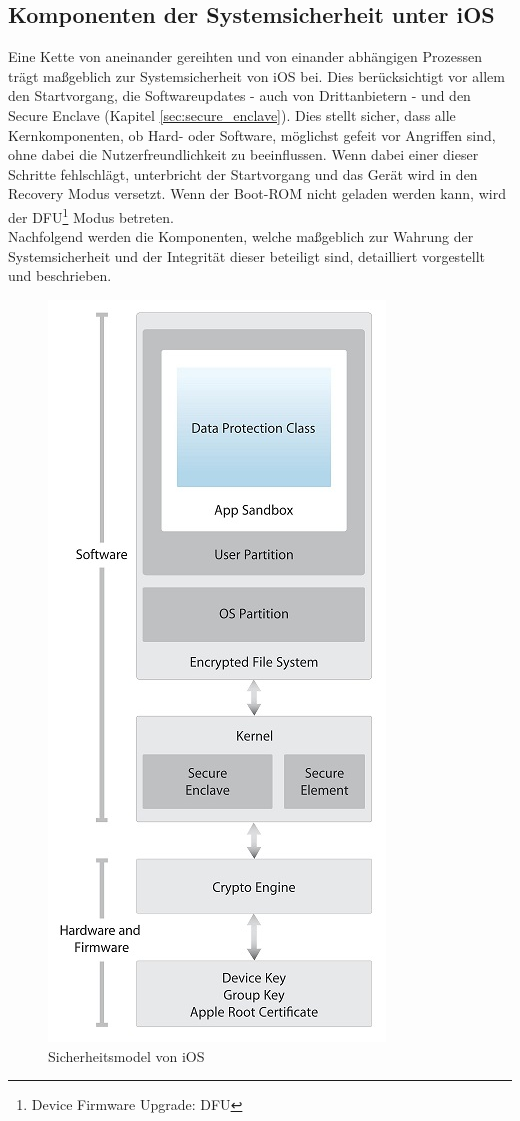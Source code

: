 \subsection{Komponenten der Systemsicherheit unter
iOS}\label{sec:components-syssec} 
	Eine Kette von aneinander gereihten und von einander abhängigen Prozessen trägt
	maßgeblich zur Systemsicherheit von iOS bei. Dies berücksichtigt vor allem den
	Startvorgang, die Softwareupdates - auch von Drittanbietern - und den Secure
	Enclave (Kapitel \ref{sec:secure_enclave}). Dies stellt sicher, dass
	alle Kernkomponenten, ob Hard- oder Software, möglichst gefeit vor Angriffen sind,
	ohne dabei die Nutzerfreundlichkeit zu beeinflussen. Wenn dabei einer dieser
	Schritte fehlschlägt, unterbricht der Startvorgang und das Gerät wird in den
	Recovery Modus versetzt. Wenn der Boot-ROM nicht geladen werden kann, wird der
	DFU\footnote{Device Firmware Upgrade: DFU} Modus
	betreten.\\
	Nachfolgend werden die Komponenten, welche maßgeblich zur Wahrung der
	Systemsicherheit und der Integrität dieser beteiligt sind, detailliert
	vorgestellt und beschrieben.
	
	\begin{figure}[h]
		\centering
		\includegraphics[width=0.4\linewidth]{ios/media/security-model.jpg}
		\caption{Sicherheitsmodel von iOS 
		\cite[S.4]{iOSSecurityApr2015}}
		\label{fig:security-model}
	\end{figure}

